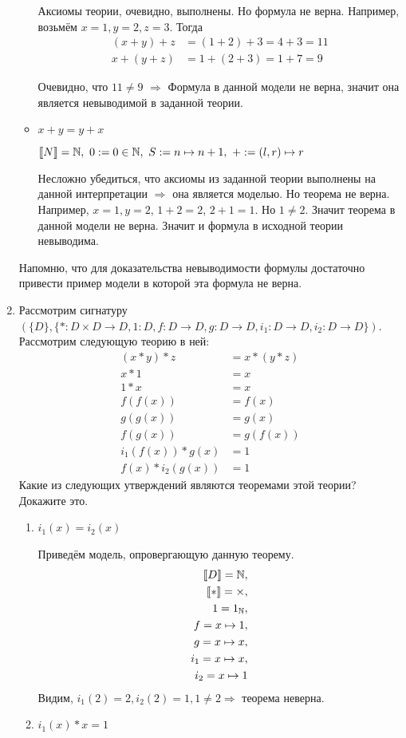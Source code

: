 \begin{enumerate}
\begin{itemize}
Аксиомы теории, очевидно, выполнены. Но формула не верна. Например, возьмём $x = 1, y = 2, z = 3$. Тогда
\begin{align*}
(x + y) + z &= (1 + 2) + 3 = 4 + 3 = 11 \\
x + (y + z) &= 1 + (2 + 3) = 1 + 7 = 9
\end{align*} 

Очевидно, что $11 \neq 9$ $\Rightarrow$ Формула в данной модели не верна, значит она является невыводимой в заданной теории.

\item $x + y = y + x$

$\llb N \rrb = \mathbb{N}, \
0 := 0 \in \mathbb{N},\
S := n \mapsto n + 1, \ 
+ := (l, r) \mapsto r$

Несложно убедиться, что аксиомы из заданной теории выполнены на данной интерпретации $\Rightarrow$ она является 
моделью. Но теорема не верна. Например, $x = 1, y = 2$, $1 + 2 = 2$, $2 + 1 = 1$. Но $1 \neq 2$. Значит теорема в 
данной модели не верна. Значит и формула в исходной теории невыводима.

\end{itemize}
Напомню, что для доказательства невыводимости формулы достаточно привести пример модели в которой эта формула не 
верна.

\item Рассмотрим сигнатуру $(\{D\}, \{ * : D \times D \to D, 1 : D, f : D \to D, g : D \to D, i_1 : D \to D, i_2 : D \to D \})$.
    Рассмотрим следующую теорию в ней:
\begin{align*}
(x * y) * z & = x * (y * z) \\
x * 1 & = x \\
1 * x & = x \\
f(f(x)) & = f(x) \\
g(g(x)) & = g(x) \\
f(g(x)) & = g(f(x)) \\
i_1(f(x)) * g(x) & = 1 \\
f(x) * i_2(g(x)) & = 1
\end{align*}
Какие из следующих утверждений являются теоремами этой теории? Докажите это.
\begin{enumerate}
\item $i_1(x) = i_2(x)$\

Приведём модель, опровергающую данную теорему. 
\begin{align*}
\llbracket D \rrbracket = \mathbb{N}, \\
\llbracket * \rrbracket = \times, \\
1 = 1_{\mathbb{N}}, \\
f = x \mapsto 1, \\
g = x \mapsto x, \\
i_1 = x \mapsto x, \\
i_2 = x \mapsto 1
\end{align*}
Видим, $i_1(2) = 2, i_2(2) = 1, 1 \neq 2 \Rightarrow$ теорема неверна.
\item $i_1(x) * x = 1$


\end{enumerate}
\end{enumerate}
